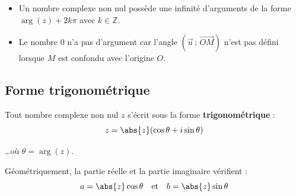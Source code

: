 \begin{rem}
	\nline
	\begin{itemize}
		\item Un nombre complexe non nul possède une infinité d'arguments de la forme $\arg(z) + 2k\pi$ avec $k \in \mathbb{Z}$.
		\item Le nombre $0$ n'a pas d'argument car l'angle $(\vec{u}\,;\,\vec{OM})$ n'est pas défini lorsque $M$ est confondu avec l'origine $O$.
	\end{itemize}
\end{rem}

\subsection{Forme trigonométrique}

\begin{prop}
	Tout nombre complexe non nul $z$ s'écrit sous la forme \textbf{trigonométrique} :
	\[
		z = \abs{z}(\cos\theta + i\sin\theta)
	\]

	\ldots où $\theta = \arg(z)$.

	Géométriquement, la partie réelle et la partie imaginaire vérifient :
	\[
		a = \abs{z}\cos\theta \quad \text{et} \quad b = \abs{z}\sin\theta
	\]

\end{prop}


